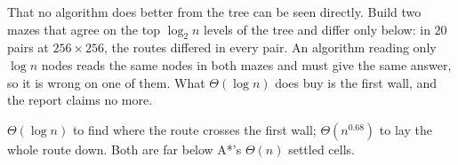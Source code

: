 That no algorithm does better from the tree can be seen directly. Build two
mazes that agree on the top $\log_2 n$ levels of the tree and differ only below:
in $20$ pairs at $256\times256$, the routes differed in every pair. An algorithm
reading only $\log n$ nodes reads the same nodes in both mazes and must give the
same answer, so it is wrong on one of them.  What $\Theta(\log n)$ does buy is the first
wall, and the report claims no more.

\begin{keypoint}
$\Theta(\log n)$ to find where the route crosses the first wall;
$\Theta(n^{0.68})$ to lay the whole route down. Both are far below A*'s
$\Theta(n)$ settled cells.
\end{keypoint}
